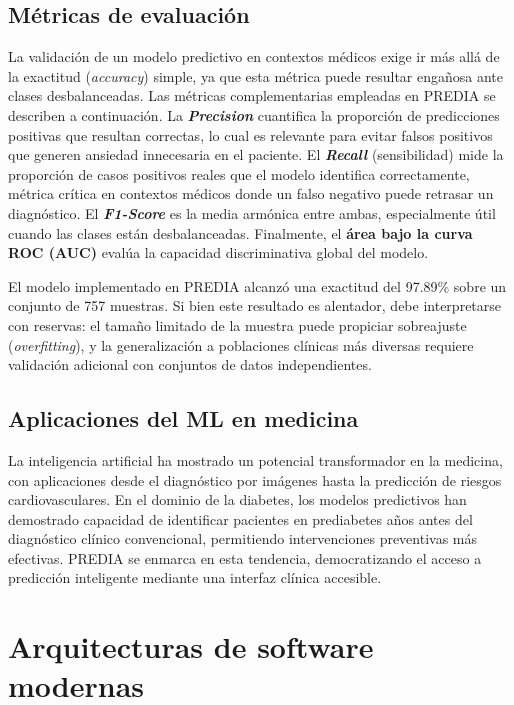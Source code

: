 \documentclass[12pt, letterpaper, twoside]{report}
\begin{document}
\subsection{Métricas de evaluación}

La validación de un modelo predictivo en contextos médicos exige ir más allá de la exactitud (\textit{accuracy}) simple, ya que esta métrica puede resultar engañosa ante clases desbalanceadas. Las métricas complementarias empleadas en PREDIA se describen a continuación. La \textbf{\textit{Precision}} cuantifica la proporción de predicciones positivas que resultan correctas, lo cual es relevante para evitar falsos positivos que generen ansiedad innecesaria en el paciente. El \textbf{\textit{Recall}} (sensibilidad) mide la proporción de casos positivos reales que el modelo identifica correctamente, métrica crítica en contextos médicos donde un falso negativo puede retrasar un diagnóstico. El \textbf{\textit{F1-Score}} es la media armónica entre ambas, especialmente útil cuando las clases están desbalanceadas. Finalmente, el \textbf{área bajo la curva ROC (AUC)} evalúa la capacidad discriminativa global del modelo.

El modelo implementado en PREDIA alcanzó una exactitud del 97.89\% sobre un conjunto de 757 muestras. Si bien este resultado es alentador, debe interpretarse con reservas: el tamaño limitado de la muestra puede propiciar sobreajuste (\textit{overfitting}), y la generalización a poblaciones clínicas más diversas requiere validación adicional con conjuntos de datos independientes.

\subsection{Aplicaciones del ML en medicina}

La inteligencia artificial ha mostrado un potencial transformador en la medicina, con aplicaciones desde el diagnóstico por imágenes hasta la predicción de riesgos cardiovasculares. En el dominio de la diabetes, los modelos predictivos han demostrado capacidad de identificar pacientes en prediabetes años antes del diagnóstico clínico convencional, permitiendo intervenciones preventivas más efectivas. PREDIA se enmarca en esta tendencia, democratizando el acceso a predicción inteligente mediante una interfaz clínica accesible.

\section{Arquitecturas de software modernas}
\end{document}
